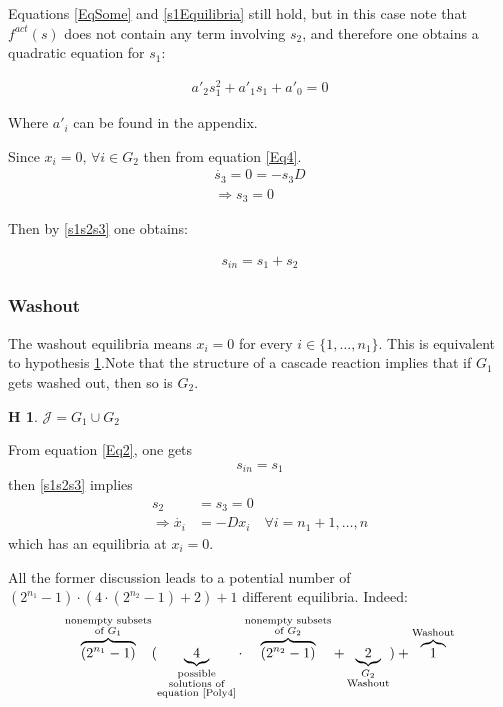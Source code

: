 \documentclass[3p,times]{article}
\newtheorem{hypo}{H}
\begin{document}
Equations \eqref{EqSome} and \eqref{s1Equilibria} still hold, but in this case note that $f^{act}(s)$ does not contain any term involving $s_2$, and therefore one obtains a quadratic equation for $s_1$:

\begin{align}
\label{poly2_s1} a'_2 s_1^2 + a'_1s_1 + a'_0 = 0
\end{align}

Where $a'_i$ can be found in the appendix.

Since $x_i = 0, \, \forall i \in G_2$ then from equation \eqref{Eq4}.
\begin{align}
\dot{s_3} = 0 = -s_3D \\
\Rightarrow s_3 = 0
\end{align}

Then by \eqref{s1s2s3} one obtains:

\begin{align}
s_{in} = s_1 + s_2
\end{align}



\subsubsection{Washout}
	
The washout equilibria means $x_i = 0$ for every $i \in \{1,\dots, n_1\}$. This is equivalent to hypothesis \ref{hypothesis washout}.Note that the structure of a cascade reaction implies that if $G_1$ gets washed out, then so is $G_2$.

\begin{hypo} 
	$\mathcal{J} = G_1 \cup G_2$
	\label{hypothesis washout}
\end{hypo} 

From equation \eqref{Eq2}, one gets 
\begin{align*} s_{in} = s_1 \end{align*}
then \eqref{s1s2s3} implies \begin{align*}s_2 &= s_3 = 0 \\ \Rightarrow \dot{x_i} &= -Dx_i \quad \forall i = n_1+1, \dots, n\end{align*}   
which has an equilibria at $x_i = 0$. 

All the former discussion leads to a potential number of   $ (2^{n_1}-1)\cdot (4\cdot(2^{n_2}-1)+2)+1 $  different equilibria. Indeed: 
\begin{align} \overbrace{(2^{n_1}-1)}^{\substack{\text{nonempty subsets} \\ \text{of }G_1 }} (\underbrace{4}_{\substack{\text{possible} \\ \text{solutions of} \\ \text{equation \eqref{Poly4}}}} \cdot\overbrace{(2^{n_2}-1)}^{\substack{\text{nonempty subsets} \\ \text{of  }G_2}}+\underbrace{2}_{\substack{G_2 \\ \text{Washout}}})+\overbrace{1}^\text{Washout} 
\end{align}
\end{document}
